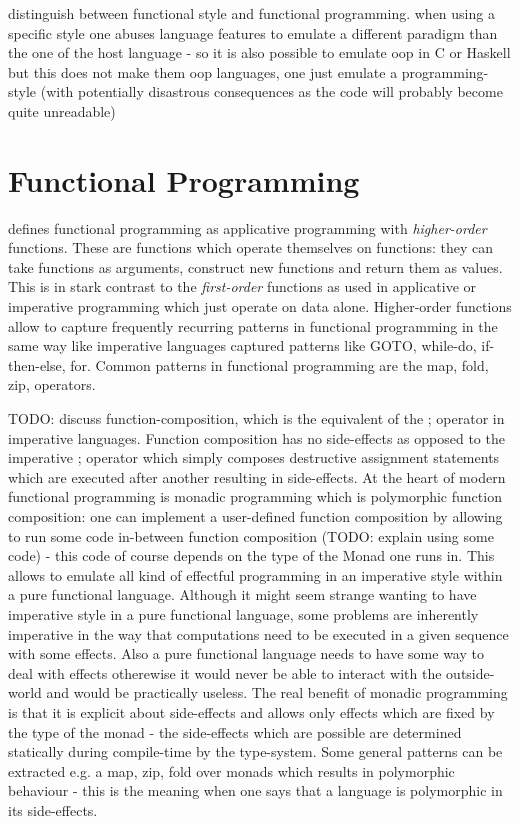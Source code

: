 distinguish between functional style and functional programming. when using a specific style one abuses language features to emulate a different paradigm than the one of the host language - so it is also possible to emulate oop in C or Haskell but this does not make them oop languages, one just emulate a programming-style (with potentially disastrous consequences as the code will probably become quite unreadable)

\section{Functional Programming}
\cite{maclennan_functional_1990} defines functional programming as applicative programming with \textit{higher-order} functions. These are functions which operate themselves on functions: they can take functions as arguments, construct new functions and return them as values. This is in stark contrast to the \textit{first-order} functions as used in applicative or imperative programming which just operate on data alone.
Higher-order functions allow to capture frequently recurring patterns in functional programming in the same way like imperative languages captured patterns like GOTO, while-do, if-then-else, for. Common patterns in functional programming are the map, fold, zip, operators.

TODO: discuss function-composition, which is the equivalent of the ; operator in imperative languages. Function composition has no side-effects as opposed to the imperative ; operator which simply composes destructive assignment statements which are executed after another resulting in side-effects.
At the heart of modern functional programming is monadic programming which is polymorphic function composition: one can implement a user-defined function composition by allowing to run some code in-between function composition (TODO: explain using some code) - this code of course depends on the type of the Monad one runs in. This allows to emulate all kind of effectful programming in an imperative style within a pure functional language. Although it might seem strange wanting to have imperative style in a pure functional language, some problems are inherently imperative in the way that computations need to be executed in a given sequence with some effects. Also a pure functional language needs to have some way to deal with effects otherewise it would never be able to interact with the outside-world and would be practically useless. The real benefit of monadic programming is that it is explicit about side-effects and allows only effects which are fixed by the type of the monad - the side-effects which are possible are determined statically during compile-time by the type-system. Some general patterns can be extracted e.g. a map, zip, fold over monads which results in polymorphic behaviour - this is the meaning when one says that a language is polymorphic in its side-effects.

